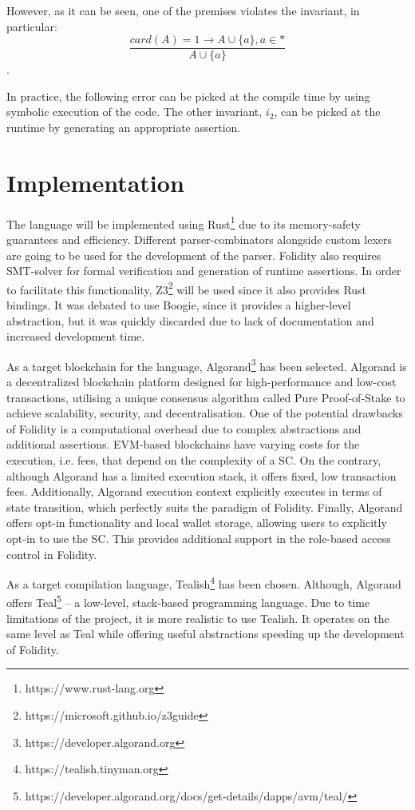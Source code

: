 \documentclass[oneside]{ecsproject}     %
\begin{document}
However, as it can be seen, one of the premises violates the invariant, in particular:
\begin{equation*}
  \frac{card(A) = 1 \rightarrow A \cup \{a\}, a \in *}{A \cup \{a\}}
\end{equation*}.

In practice, the following error can be picked at the compile time by using symbolic execution of the code.
The other invariant, $i_2$, can be picked at the runtime by generating an appropriate assertion.

\section{Implementation}

The language will be implemented using Rust\footnote{https://www.rust-lang.org} due to its memory-safety guarantees and efficiency. 
Different parser-combinators alongside custom lexers are going to be used for the development of the parser. 
Folidity also requires SMT-solver for formal verification and generation of runtime assertions. In order to facilitate this functionality,
Z3\footnote{https://microsoft.github.io/z3guide} will be used since it also provides Rust bindings. It was debated to use Boogie, since it provides
a higher-level abstraction, but it was quickly discarded due to lack of documentation and increased development time.

As a target blockchain for the language, Algorand\footnote{https://developer.algorand.org} has been selected. 
Algorand is a decentralized blockchain platform designed for high-performance and low-cost transactions, 
utilising a unique consensus algorithm called Pure Proof-of-Stake to achieve scalability, security, and decentralisation\cite{algorand}.
One of the potential drawbacks of Folidity is a computational overhead due to complex abstractions and additional assertions. 
EVM-based blockchains have varying costs for the execution, i.e. fees, that depend on the complexity of a SC. 
On the contrary, although Algorand has a limited execution stack, it offers fixed, low transaction fees.
Additionally, Algorand execution context explicitly executes in terms of state transition, which perfectly suits the paradigm of Folidity.
Finally, Algorand offers opt-in functionality and local wallet storage, allowing users to explicitly opt-in to use the SC.
This provides additional support in the role-based access control in Folidity.

As a target compilation language, Tealish\footnote{https://tealish.tinyman.org} has been chosen.
Although, Algorand offers Teal\footnote{https://developer.algorand.org/docs/get-details/dapps/avm/teal/} –
a low-level, stack-based programming language. Due to time limitations of the project, it is more realistic to use Tealish.
It operates on the same level as Teal while offering useful abstractions speeding up the development of Folidity.
\end{document}
